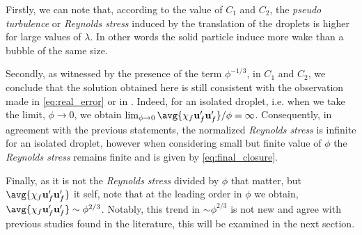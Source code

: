 Firstly, we can note that, according to the value of $C_1$ and $C_2$, the \textit{pseudo turbulence} or \textit{Reynolds stress} induced by the translation of the droplets is higher for large values of $\lambda$. 
In other words the solid particle induce more wake than a bubble of the same size. 

Secondly, as witnessed by the presence of the term $\phi^{-1/3}$, in $C_1$ and $C_2$, we conclude that the solution obtained here is still consistent with the observation made in \ref{eq:real_error} or in \citet{caflisch1985variance}. 
Indeed, for an isolated droplet, i.e. when we take the limit, $\phi \to 0$, we obtain $\lim_{\phi \to 0} \avg{\chi_f \textbf{u}_f' \textbf{u}_f'} / \phi = \infty$. 
Consequently, in agreement with the previous statements, the normalized \textit{Reynolds stress} is infinite for an isolated droplet, however when considering small but finite value of $\phi$ the \textit{Reynolds stress} remains finite and is given by \ref{eq:final_closure}. 

Finally, as it is not the \textit{Reynolds stress} divided by $\phi$ that matter, but $\avg{\chi_f\textbf{u}_f'\textbf{u}_f'}$ it self, note that at the leading order in $\phi$ we obtain,  $\avg{\chi_f\textbf{u}_f'\textbf{u}_f'}\sim\phi^{2/3}$. 
Notably, this  trend in $\sim\phi^{2/3}$ is not new and agree with previous studies found in the literature, this will be examined in the next section. 

